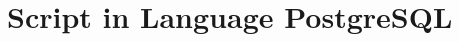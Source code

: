 \documentclass[ijgi,article,submit,moreauthors,pdftex]{Definitions/mdpi}
\begin{document}
%
%
%
%
%
\appendix
\section{Script in Language PostgreSQL}

\end{document}
